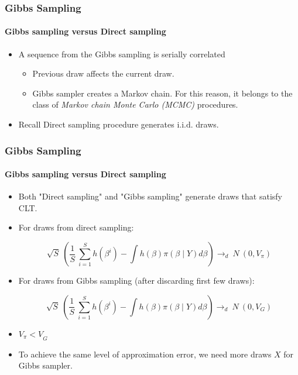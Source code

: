 \documentclass[
  shownotes,
  xcolor={svgnames},
  hyperref={colorlinks,citecolor=DarkBlue,linkcolor=DarkRed,urlcolor=DarkBlue}
  , aspectratio=169]{beamer}
\begin{document}
\begin{frame}[fragile]
\frametitle{Gibbs Sampling} 
\framesubtitle{Gibbs sampling versus Direct sampling}


\begin{itemize}


    \item A sequence from the Gibbs sampling is serially correlated
    \medskip
    \begin{itemize}
        \item Previous draw affects the current draw.
        \medskip
        \item Gibbs sampler creates a Markov chain. For this reason, it belongs to the class of {\it Markov chain Monte Carlo (MCMC)} procedures.
        \medskip
    \end{itemize}
    \item Recall Direct sampling procedure generates $\text{i.i.d.}$ draws.
\end{itemize}
 
 \end{frame}
\begin{frame}[fragile]
\frametitle{Gibbs Sampling} 
\framesubtitle{Gibbs sampling versus Direct sampling}

\begin{itemize}
\item Both "Direct sampling" and "Gibbs sampling" generate draws that satisfy CLT.

\item For draws from direct sampling:

$$\sqrt{S}\ \left( \frac{1}{S}\ \sum_{i = 1}^{S}h\left( \beta^{i} \right)  - \int{h\left( \beta \right)\pi\left( \beta \middle| Y \right)d\beta} \right)  \rightarrow_{d}\ N\ (0,V_\pi)$$


\item For draws from Gibbs sampling (after discarding first few draws):

$$\sqrt{S}\ \left( \frac{1}{S}\ \sum_{i = 1}^{S}h\left( \beta^{i} \right)  - \int{h\left( \beta \right)\pi\left( \beta \middle| Y \right)d\beta} \right)  \rightarrow_{d}\ N\ (0,V_{G})$$


\item ${V_{\pi} < V}_{G}$

\item To achieve the same level of approximation error, we need more draws $X$ for Gibbs sampler.
\end{itemize}
 \end{frame}
\end{document}
